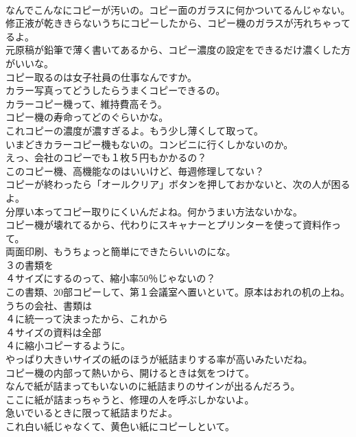 \documentclass[8pt]{extreport}
\begin{document}
\begin{CJK}{UTF8}{min}
\\	なんでこんなにコピーが汚いの。コピー面のガラスに何かついてるんじゃない。	
\\	修正液が乾ききらないうちにコピーしたから、コピー機のガラスが汚れちゃってるよ。	
\\	元原稿が鉛筆で薄く書いてあるから、コピー濃度の設定をできるだけ濃くした方がいいな。	
\\	コピー取るのは女子社員の仕事なんですか。	
\\	カラー写真ってどうしたらうまくコピーできるの。	
\\	カラーコピー機って、維持費高そう。	
\\	コピー機の寿命ってどのぐらいかな。	
\\	これコピーの濃度が濃すぎるよ。もう少し薄くして取って。	
\\	いまどきカラーコピー機もないの。コンビニに行くしかないのか。	
\\	えっ、会社のコピーでも１枚５円もかかるの？	
\\	このコピー機、高機能なのはいいけど、毎週修理してない？	
\\	コピーが終わったら「オールクリア」ボタンを押しておかないと、次の人が困るよ。	
\\	分厚い本ってコピー取りにくいんだよね。何かうまい方法ないかな。	
\\	コピー機が壊れてるから、代わりにスキャナーとプリンターを使って資料作って。	
\\	両面印刷、もうちょっと簡単にできたらいいのにな。	
\\	３の書類を
\\	４サイズにするのって、縮小率50％じゃないの？	
\\	この書類、20部コピーして、第１会議室へ置いといて。原本はおれの机の上ね。	
\\	うちの会社、書類は
\\	４に統一って決まったから、これから
\\	４サイズの資料は全部
\\	４に縮小コピーするように。	
\\	やっぱり大きいサイズの紙のほうが紙詰まりする率が高いみたいだね。	
\\	コピー機の内部って熱いから、開けるときは気をつけて。	
\\	なんで紙が詰まってもいないのに紙詰まりのサインが出るんだろう。	
\\	ここに紙が詰まっちゃうと、修理の人を呼ぶしかないよ。	
\\	急いでいるときに限って紙詰まりだよ。	
\\	これ白い紙じゃなくて、黄色い紙にコピーしといて。	

\end{CJK}
\end{document}
